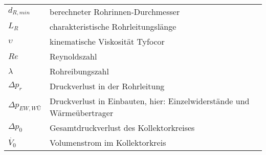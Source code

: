 \begin{table}[H]
{\begin{tabular}{ll}
    $d_{R,min}$  & berechneter Rohrinnen-Durchmesser       \\
    $L_R$ & charakteristische Rohrleitungslänge     \\
    $\upsilon$  & kinematische Viskosität Tyfocor         \\
    $Re$ & Reynoldszahl                            \\
    $\lambda$  & Rohreibungszahl                         \\
    $\Delta p_r$ & Druckverlust in der Rohrleitung         \\
    $\Delta p_{EW,WÜ}$                                          & Druckverlust in Einbauten, hier: Einzelwiderstände und Wärmeübertrager \\
    $\Delta p_0$ & Gesamtdruckverlust des Kollektorkreises \\
    $\dot{V_0}$  & Volumenstrom im Kollektorkreis         
    \end{tabular}%
    }
    \end{table}